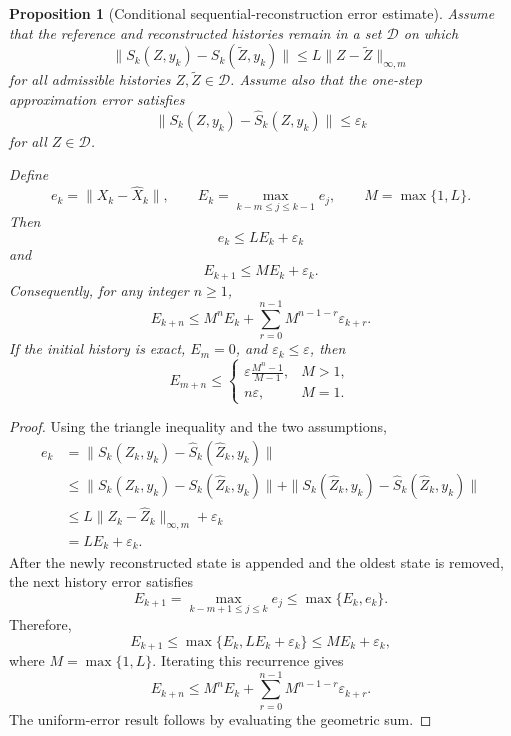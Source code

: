 \documentclass[10pt,a4paper]{amsart}
\newtheorem{proposition}{Proposition}
\begin{document}
\begin{proposition}[Conditional sequential-reconstruction error estimate]
Assume that the reference and reconstructed histories remain in a set
$\mathcal{D}$ on which
\[
\|S_k(Z,y_k)-S_k(\widetilde{Z},y_k)\|
\leq
L\|Z-\widetilde{Z}\|_{\infty,m}
\]
for all admissible histories $Z,\widetilde{Z}\in\mathcal{D}$. Assume also
that the one-step approximation error satisfies
\[
\|S_k(Z,y_k)-\widehat{S}_k(Z,y_k)\|
\leq
\varepsilon_k
\]
for all $Z\in\mathcal{D}$.

Define
\[
e_k=\|X_k-\widehat{X}_k\|,
\qquad
E_k=\max_{k-m\leq j\leq k-1}e_j,
\qquad
M=\max\{1,L\}.
\]
Then
\[
e_k\leq L E_k+\varepsilon_k
\]
and
\[
E_{k+1}\leq M E_k+\varepsilon_k.
\]
Consequently, for any integer $n\geq1$,
\[
E_{k+n}
\leq
M^nE_k
+
\sum_{r=0}^{n-1}M^{n-1-r}\varepsilon_{k+r}.
\]
If the initial history is exact, $E_m=0$, and
$\varepsilon_k\leq\varepsilon$, then
\[
E_{m+n}
\leq
\begin{cases}
\displaystyle
\varepsilon\frac{M^n-1}{M-1},
& M>1,\\[8pt]
n\varepsilon,
& M=1.
\end{cases}
\]
\end{proposition}

\begin{proof}
Using the triangle inequality and the two assumptions,
\[
\begin{aligned}
e_k
&=
\|S_k(Z_k,y_k)-\widehat{S}_k(\widehat{Z}_k,y_k)\|\\
&\leq
\|S_k(Z_k,y_k)-S_k(\widehat{Z}_k,y_k)\|
+
\|S_k(\widehat{Z}_k,y_k)
-\widehat{S}_k(\widehat{Z}_k,y_k)\|\\
&\leq
L\|Z_k-\widehat{Z}_k\|_{\infty,m}
+\varepsilon_k\\
&=
LE_k+\varepsilon_k.
\end{aligned}
\]
After the newly reconstructed state is appended and the oldest state is
removed, the next history error satisfies
\[
E_{k+1}
=
\max_{k-m+1\leq j\leq k}e_j
\leq
\max\{E_k,e_k\}.
\]
Therefore,
\[
E_{k+1}
\leq
\max\{E_k,LE_k+\varepsilon_k\}
\leq
ME_k+\varepsilon_k,
\]
where $M=\max\{1,L\}$. Iterating this recurrence gives
\[
E_{k+n}
\leq
M^nE_k
+
\sum_{r=0}^{n-1}M^{n-1-r}\varepsilon_{k+r}.
\]
The uniform-error result follows by evaluating the geometric sum.
\end{proof}
\end{document}
